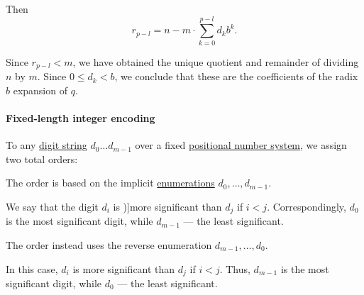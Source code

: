 \begin{defproof}
  Then
  \begin{equation*}
    r_{p-l} = n - m \cdot \sum_{k=0}^{p-l} d_k b^k.
  \end{equation*}

  Since \( r_{p-l} < m \), we have obtained the unique quotient and remainder of dividing \( n \) by \( m \). Since \( 0 \leq d_k < b \), we conclude that these are the coefficients of the radix \( b \) expansion of \( q \).
\end{defproof}

\paragraph{Fixed-length integer encoding}

\begin{definition}\label{def:endianness}\mimprovised
  To any \hyperref[def:positional_number_system]{digit string} \( d_0 \ldots d_{m-1} \) over a fixed \hyperref[def:positional_number_system]{positional number system}, we assign two total orders:

  \begin{thmenum}
     The  order is based on the implicit \hyperref[def:enumeration]{enumerations} \( d_0, \ldots, d_{m-1} \).

    We say that the digit \( d_i \) is \term[en=more significant (\cite[195]{Knuth1997ArtVol2})]{more significant} than \( d_j \) if \( i < j \). Correspondingly, \( d_0 \) is the most significant digit, while \( d_{m-1} \) --- the least significant.

     The  order instead uses the reverse enumeration \( d_{m-1}, \ldots, d_0 \).

    In this case, \( d_i \) is more significant than \( d_j \) if \( i < j \). Thus, \( d_{m-1} \) is the most significant digit, while \( d_0 \) --- the least significant.
  \end{thmenum}
\end{definition}
